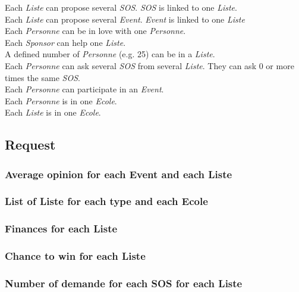 \documentclass[a4paper,oneside,1pt]{article}
\begin{document}
Each \textit{Liste} can propose several \textit{SOS}. \textit{SOS} is linked to one \textit{Liste}. \\
Each \textit{Liste} can propose several \textit{Event}. \textit{Event} is linked to one \textit{Liste} \\
Each \textit{Personne} can be in love with one \textit{Personne}. \\
Each \textit{Sponsor} can help one \textit{Liste}. \\
A defined number of \textit{Personne} (e.g. 25) can be in a \textit{Liste}. \\
Each \textit{Personne} can ask several \textit{SOS} from several \textit{Liste}. They can ask 0 or more times the same \textit{SOS}. \\
Each \textit{Personne} can participate in an \textit{Event}. \\
Each \textit{Personne} is in one \textit{Ecole}. \\
Each \textit{Liste} is in one \textit{Ecole}. \\

\subsection{Request}


\subsubsection{Average opinion for each Event and each Liste} 

\subsubsection{List of Liste for each type and each Ecole}
\subsubsection{Finances for each Liste}
\subsubsection{Chance to win for each Liste}
\subsubsection{Number of demande for each SOS for each Liste}
\end{document}
